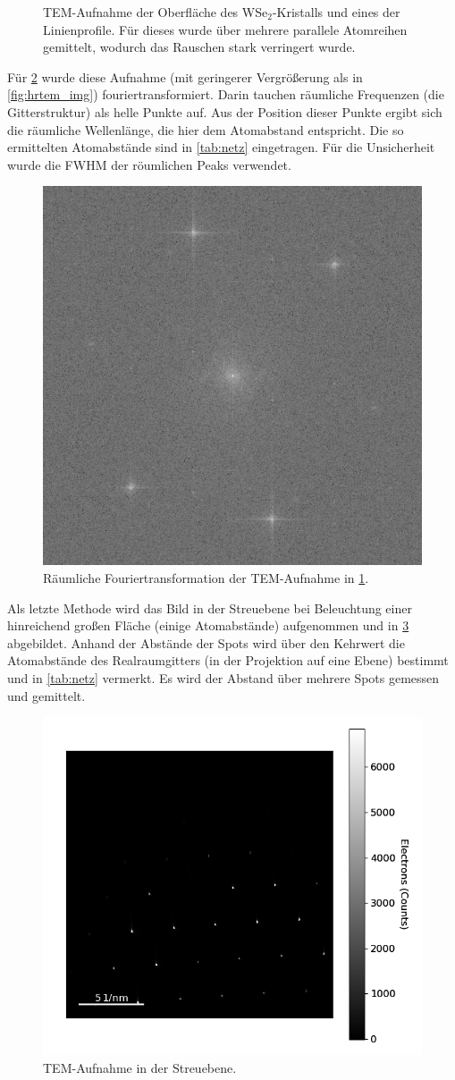 \begin{figure}[H]
\begin{subfigure}[b]{0.45\textwidth}
				\caption{}
		\end{subfigure}
		\label{fig:hrtem}
		\caption{
      TEM-Aufnahme der Oberfläche des WSe$_2$-Kristalls und eines der Linienprofile. Für dieses wurde über mehrere parallele Atomreihen gemittelt, wodurch das Rauschen stark verringert wurde.
				}
	\end{figure}

  Für \cref{fig:ft} wurde diese Aufnahme (mit geringerer Vergrößerung als in \cref{fig:hrtem_img}) fouriertransformiert.
  Darin tauchen räumliche Frequenzen (die Gitterstruktur) als helle Punkte auf.
  Aus der Position dieser Punkte ergibt sich die räumliche Wellenlänge, die hier dem Atomabstand entspricht.
  Die so ermittelten Atomabstände sind in \cref{tab:netz} eingetragen.
  Für die Unsicherheit wurde die FWHM der röumlichen Peaks verwendet.

	\begin{figure}[H]
  \centering
			\includegraphics[width= 0.4 \linewidth]{img/tem_hrtem_crop_fft}
			\caption{
        Räumliche Fouriertransformation der TEM-Aufnahme in \cref{fig:hrtem}.
			}
			\label{fig:ft}
	\end{figure}

  Als letzte Methode wird das Bild in der Streuebene bei Beleuchtung einer hinreichend großen Fläche (einige Atomabstände) aufgenommen und in \cref{fig:diff} abgebildet.
  Anhand der Abstände der Spots wird über den Kehrwert die Atomabstände des Realraumgitters (in der Projektion auf eine Ebene) bestimmt und in \cref{tab:netz} vermerkt.
  Es wird der Abstand über mehrere Spots gemessen und gemittelt.

	\begin{figure}[H]
  \centering
			\includegraphics[width= 0.6 \linewidth]{img/tem_diff}
			\caption{
        TEM-Aufnahme in der Streuebene.
			}
			\label{fig:diff}
	\end{figure}



